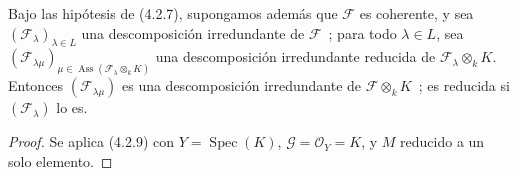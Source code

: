 \begin{corollary}[4.2.10]
\label{IV.2.4.2.10-fr}
Bajo las hipótesis de \textup{(4.2.7)}, supongamos además que $\mathcal F$ es coherente,
y sea $(\mathcal F_\lambda)_{\lambda\in L}$ una descomposición irredundante de
$\mathcal F$~; para todo $\lambda\in L$, sea
$(\mathcal F_{\lambda\mu})_{\mu\in
\operatorname{Ass}(\mathcal F_\lambda\otimes_k K)}$ una descomposición
irredundante reducida de $\mathcal F_\lambda\otimes_k K$. Entonces
$(\mathcal F_{\lambda\mu})$ es una descomposición irredundante de
$\mathcal F\otimes_k K$~; es reducida si $(\mathcal F_\lambda)$ lo es.
\end{corollary}

\begin{proof}
Se aplica (4.2.9) con $Y=\operatorname{Spec}(K)$,
$\mathcal G=\mathcal O_Y=K$, y $M$ reducido a un solo elemento.
\end{proof}


